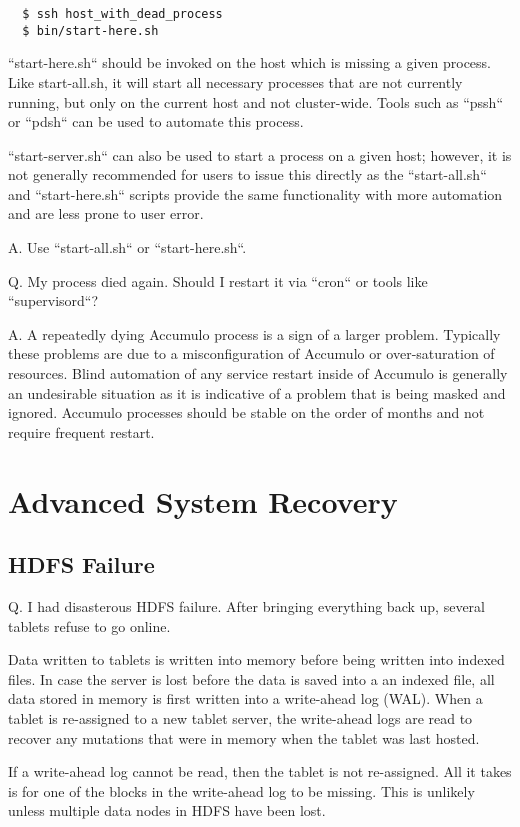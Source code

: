 \small
\begin{verbatim}
  $ ssh host_with_dead_process
  $ bin/start-here.sh
\end{verbatim}
\normalsize

``start-here.sh`` should be invoked on the host which is missing a given process. Like start-all.sh, it will start all
necessary processes that are not currently running, but only on the current host and not cluster-wide. Tools such as ``pssh`` or 
``pdsh`` can be used to automate this process.

``start-server.sh`` can also be used to start a process on a given host; however, it is not generally recommended for
users to issue this directly as the ``start-all.sh`` and ``start-here.sh`` scripts provide the same functionality with
more automation and are less prone to user error.

A. Use ``start-all.sh`` or ``start-here.sh``.

Q. My process died again. Should I restart it via ``cron`` or tools like ``supervisord``?

A. A repeatedly dying Accumulo process is a sign of a larger problem. Typically these problems are due to a
misconfiguration of Accumulo or over-saturation of resources. Blind automation of any service restart inside of Accumulo
is generally an undesirable situation as it is indicative of a problem that is being masked and ignored. Accumulo
processes should be stable on the order of months and not require frequent restart.


\section{Advanced System Recovery}

\subsection{HDFS Failure}
Q. I had disasterous HDFS failure.  After bringing everything back up, several tablets refuse to go online.

Data written to tablets is written into memory before being written into indexed files.  In case the server
is lost before the data is saved into a an indexed file, all data stored in memory is first written into a
write-ahead log (WAL).  When a tablet is re-assigned to a new tablet server, the write-ahead logs are read to
recover any mutations that were in memory when the tablet was last hosted.

If a write-ahead log cannot be read, then the tablet is not re-assigned.  All it takes is for one of
the blocks in the write-ahead log to be missing.  This is unlikely unless multiple data nodes in HDFS have been
lost.

